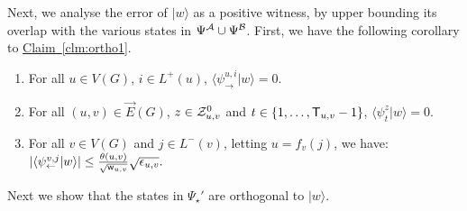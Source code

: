 \documentclass{theoretics}
\newcommand{\clm}[1]{\hyperref[clm:#1]{Claim~\ref*{clm:#1}}}
\def\ket#1{{\lvert}#1\rangle}
\renewcommand{\>}{\rangle}
\newcommand{\<}{\langle}
\renewcommand{\(}{\left(}
\renewcommand{\)}{\right)}
\def\braket#1#2{{{\langle}#1\vert}#2\rangle}
\def\w{{\sf w}}
\begin{document}
Next, we analyse the error of $\ket{w}$ as a positive witness, by upper bounding its overlap with the various states in $\Psi^{\cal A}\cup\Psi^{\cal B}$. 
First, we have the following corollary to \clm{ortho1}. 
\begin{corollary}\label{cor:ortho1}
\begin{enumerate}
\item For all $u\in V(G)$, $i\in L^+(u)$, $\braket{\psi_{\rightarrow}^{u,i}}{w}=0$.
\item For all $(u,v)\in\overrightarrow{E}(G)$, $z\in{\cal Z}_{u,v}^0$ and $t\in \{1,\dots,{\sf T}_{u,v}-1\}$, $\braket{\psi_{t}^z}{w}=0$.
\item For all $v\in V(G)$ and $j\in L^-(v)$, letting $u=f_v(j)$, we have: 
$|\braket{\psi_{\leftarrow}^{v,j}}{w}|\leq \frac{\theta(u,v)}{\sqrt{\w_{u,v}}}\sqrt{\epsilon_{u,v}}.$
\end{enumerate}
\end{corollary}

\noindent Next we show that the states in $\Psi_\star'$ are orthogonal to $\ket{w}$. 
\end{document}

